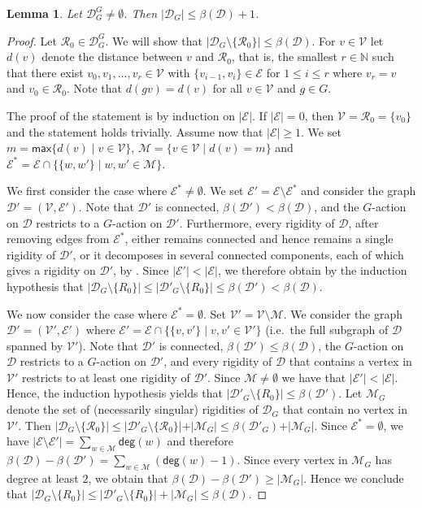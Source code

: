 \documentclass[10pt,a4paper]{amsart}
\newtheorem{lem}{Lemma}
\renewcommand{\deg}{\mathsf{deg}}
\renewcommand{\geq}{\geqslant}
\renewcommand{\leq}{\leqslant}
\renewcommand{\max}{\mathsf{max}}
\newcommand\mc\mathcal
\newcommand\nat{\mathbb N}
\begin{document}
\begin{lem}\label{L:G-fixpoint-pivot-count}
Let $\mc{D}^G_G\neq \emptyset$.
Then $|\mc{D}_G | \leq \beta(\mc{D}) + 1$.  
\end{lem}

\begin{proof}
Let  $\mc{R}_0 \in \mc{D}^G_G$. We will show that  $|\mc{D}_G \setminus \{\mc{R}_0\} | \leq \beta(\mc{D})$.
For $v\in\mc{V}$ let $d(v)$ denote the distance between $v$ and $\mc{R}_0$, that is,
the smallest $r\in\nat$ such that there exist $v_0,v_1,\ldots,v_r\in\mc{V}$ with $\{v_{i-1},v_i\}\in\mc{E}$ for $1\leq i\leq r$ where $v_r=v$ and $v_0 \in \mc{R}_0$.
Note that $d(gv)=d(v)$ for all $v\in\mc{V}$ and $g\in G$.

The proof of the statement is  by induction 
 on $|\mc{E}|$.
If $|\mc{E}|=0$, then $\mc{V}= \mc{R}_0=\{v_0\}$ and the statement holds trivially.
Assume now that $|\mc{E}|\geq 1$. We set $m=\max\{d(v)\mid v\in\mc{V}\}$, $\mc{M}=\{v\in\mc{V}\mid d(v)=m\}$ and $\mc{E}^\ast=\mc{E}\cap\{\{w,w'\}\mid w,w'\in\mc{M}\}$.

We first consider the case where $\mc{E}^\ast\neq \emptyset$.
We set $\mc{E}'=\mc{E}\setminus\mc{E}^\ast$ and consider the graph $\mc{D}'=(\mc{V},\mc{E}')$.
Note that $\mc{D}'$ is connected, $\beta(\mc{D}') <\beta(\mc{D})$, and the $G$-action on $\mc{D}$ restricts to a $G$-action on $\mc{D}'$.
Furthermore, every rigidity of $\mc{D}$, after removing edges from $\mc{E}^\ast$, either remains connected and hence remains a single rigidity of $\mc{D}'$, or it decomposes in several connected components, each of which gives a rigidity on $\mc{D}'$, by .
Since $|\mc{E}'|<|\mc{E}|$, we therefore obtain by the induction hypothesis that 
$|\mc{D}_G\setminus\{R_0\}|\leq |\mc{D}'_G\setminus\{R_0\}|\leq \beta(\mc{D}')< \beta(\mc{D})$.

We now consider the case where $\mc{E}^\ast=\emptyset$. 
Set $\mc{V}'=\mc{V}\setminus \mc{M}$. We consider the graph $\mc{D}'=(\mc{V}',\mc{E}')$ where $\mc{E}'=\mc{E}\cap\{\{v,v'\}\mid v,v'\in\mc{V}'\}$ (i.e.~the full subgraph of $\mc{D}$ spanned by $\mc{V}'$).
Note that $\mc{D}'$ is connected,  $\beta(\mc{D}')\leq \beta(\mc{D})$, the $G$-action on $\mc{D}$ restricts to a $G$-action on $\mc{D}'$, and every rigidity of $\mc{D}$ that contains a vertex in $\mc{V}'$ restricts to at least one rigidity of $\mc{D}'$. 
Since $\mc{M}\neq \emptyset$ we have that $|\mc{E}'|<|\mc{E}|$.
Hence, the induction hypothesis yields that  $|\mc{D}'_G\setminus\{R_0\}|\leq \beta(\mc{D}')$. Let $\mc{M}_G$ denote the set of (necessarily singular) rigidities of $\mc{D}_G$ that contain no vertex in $\mc{V}'$.  Then 
$\vert \mc{D}_G\setminus\{\mc{R}_0\} \vert \leq \vert \mc{D}'_G\setminus\{\mc{R}_0\} \vert + \vert \mc{M}_G \vert \leq \beta(\mc{D}'_G) + \vert \mc{M}_G  \vert$.
Since $\mc{E}^\ast=\emptyset$, we have $|\mc{E}\setminus\mc{E}'| = \sum_{w \in \mc{M}} \deg(w)$ and therefore
$\beta(\mc{D})-\beta(\mc{D}')=\sum_{w\in\mc{M}}(\deg(w)-1)$.
Since every vertex in $\mc{M}_G$ has degree at least $2$, we obtain that 
 $\beta(\mc{D})-\beta(\mc{D}')\geq |\mc{M}_G|$.
Hence we conclude that 
 $|\mc{D}_G\setminus\{R_0\}|\leq |\mc{D}'_G \setminus\{R_0\}|+|\mc{M}_G|\leq \beta(\mc{D})$.
\end{proof}
\end{document}
